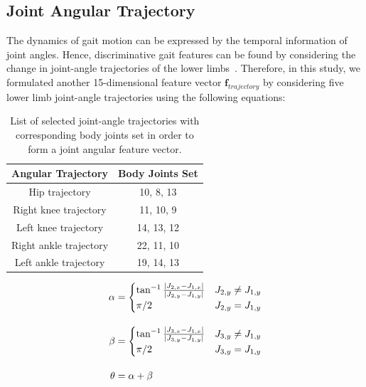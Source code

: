 \subsection{Joint Angular Trajectory}
The dynamics of gait motion can be expressed by the temporal information of joint angles. Hence, discriminative gait features can be found by considering the change in joint-angle trajectories of the lower limbs~\cite{Wang_04}. Therefore, in this study, we formulated another 15-dimensional feature vector $\boldsymbol{f}_{trajectory}$ by considering five lower limb joint-angle trajectories using the following equations: 

\begin{table}
	\centering
	\caption{List of selected joint-angle trajectories with corresponding body joints set in order to form a joint angular feature vector. \label{table:list_joint_angle_trajectory}}
	\begin{tabular}{cc}
		\hline
		\textbf{Angular Trajectory} & \textbf{Body Joints Set}\\
		
		\hline
		Hip trajectory &10, 8, 13 \\
		Right knee trajectory  &11, 10, 9 \\
		Left knee trajectory &14, 13, 12 \\
		Right ankle trajectory &22, 11, 10 \\
		Left ankle trajectory &19, 14, 13 \\
		\hline
	\end{tabular}
\end{table}

\begin{equation}
	\begin{split}
	\alpha &= 
	\begin{cases}
	\tan^{-1}{\frac{|J_{2,x}-J_{1,x}|}{|J_{2,y}-J_{1,y}|}} & J_{2,y} \neq J_{1,y}\\
	\pi/2 & J_{2,y} = J_{1,y}
	\end{cases} \\ \noalign{\vskip10pt}
	\beta &= 
	\begin{cases}
	\tan^{-1}{\frac{|J_{3,x}-J_{1,x}|}{|J_{3,y}-J_{1,y}|}} & J_{3,y} \neq J_{1,y}\\
	\pi/2 & J_{3,y} = J_{1,y}
	\end{cases} \\ \noalign{\vskip10pt}
	\theta &= \alpha + \beta
	\end{split}
\end{equation}


